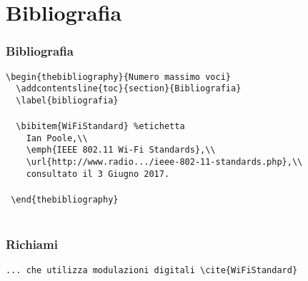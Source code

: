 \section{Bibliografia}
\begin{frame}[fragile]\transfade\centering
  \frametitle{Bibliografia}
  \verb!\begin{thebibliography}{Numero massimo voci}               !\\
  \verb!  \addcontentsline{toc}{section}{Bibliografia}             !\\
  \verb!  \label{bibliografia}                                     !\\
  ~\\
  \verb!  \bibitem{WiFiStandard} %etichetta                        !\\
  \verb!    Ian Poole,\\                                           !\\
  \verb!    \emph{IEEE 802.11 Wi-Fi Standards},\\                  !\\
  \verb!    \url{http://www.radio.../ieee-802-11-standards.php},\\ !\\
  \verb!    consultato il 3 Giugno 2017.                           !\\
  ~\\
  \verb! \end{thebibliography}                                     !\\~
\end{frame}
\begin{frame}[fragile]\transfade\centering
  \frametitle{Richiami}
  \verb!... che utilizza modulazioni digitali \cite{WiFiStandard}!\\~\\~
  \\~
\end{frame}
